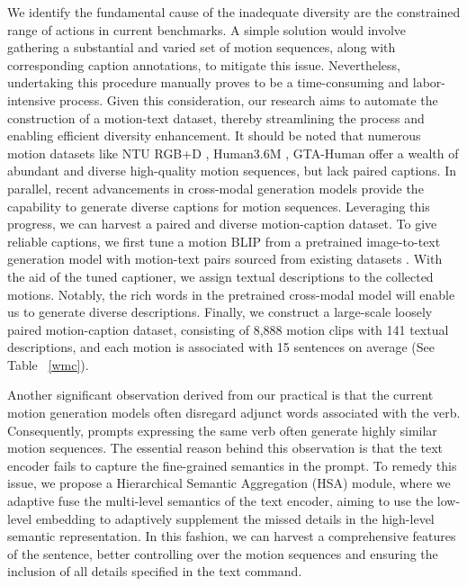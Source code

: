 \documentclass[letterpaper]{article} \usepackage{aaai24}
\begin{document}
We identify the fundamental cause of the inadequate diversity are the constrained range of actions in current benchmarks.
A simple solution would involve gathering a substantial and varied set of motion sequences, along with corresponding caption annotations, to mitigate this issue.
Nevertheless, undertaking this procedure manually proves to be a time-consuming and labor-intensive process. Given this consideration, our research aims to automate the construction of a motion-text dataset, thereby streamlining the process and enabling efficient diversity enhancement. It should be noted that numerous motion datasets like NTU RGB+D \cite{shahroudy2016ntu}, Human3.6M \cite{h36m_pami}, GTA-Human \cite{cai2021playing} offer a wealth of abundant and diverse high-quality motion sequences, but lack paired captions. In parallel, recent advancements in cross-modal generation models provide the capability to generate diverse captions for motion sequences. Leveraging this progress, we can harvest a paired and diverse motion-caption dataset. To give reliable captions, we first tune a motion BLIP from a pretrained image-to-text generation model with motion-text pairs sourced from existing datasets \cite{guo2022generating,Plappert_2016}. With the aid of the tuned captioner, we assign textual descriptions to the collected motions.  Notably, the rich words in the pretrained cross-modal model will enable us to generate diverse descriptions.
Finally, we construct a large-scale loosely paired motion-caption dataset, consisting of 8,888 motion clips with 141 textual descriptions, and each motion is associated with 15 sentences on average (See Table ~\ref{wmc}).


Another significant observation derived from our practical is that the current motion generation models often disregard adjunct words associated with the verb. Consequently, prompts expressing the same verb often generate highly similar motion sequences. The essential reason behind this observation is that the text encoder fails to capture the fine-grained semantics in the prompt. To remedy this issue, we propose a Hierarchical Semantic Aggregation (HSA) module, where we adaptive fuse the multi-level semantics of the text encoder, aiming to use the low-level embedding to adaptively supplement the missed details in the high-level semantic representation. In this fashion, we can harvest a comprehensive features of the sentence,  better controlling over the motion sequences and ensuring the inclusion of all details specified in the text command.
\end{document}
